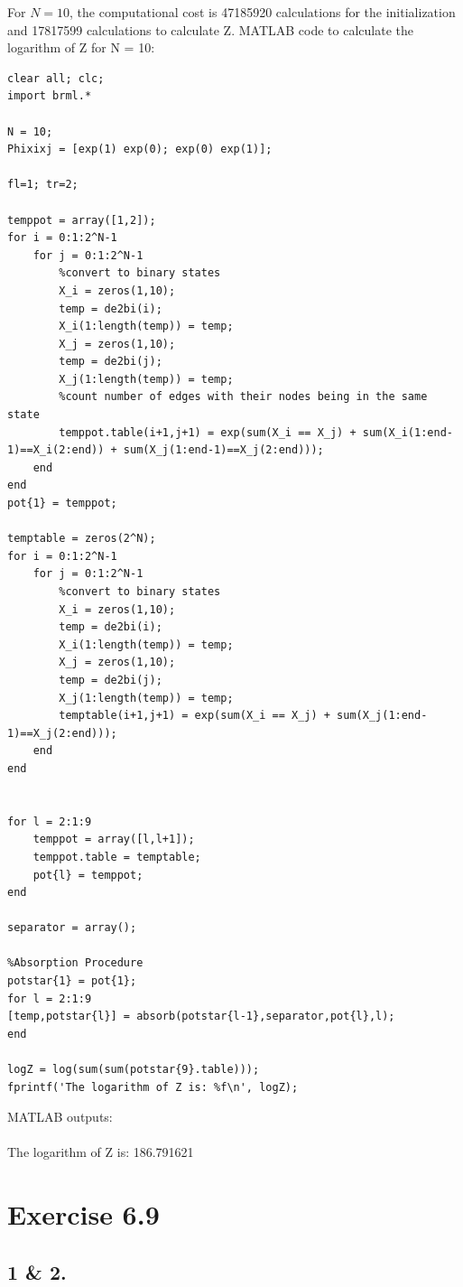 \documentclass[11pt,a4paper,oneside]{report}
\begin{document}
For $N=10$, the computational cost is 47185920 calculations for the initialization and 17817599 calculations to calculate Z. MATLAB code to calculate the logarithm of Z for N = 10:\\

\begin{lstlisting}
clear all; clc;
import brml.*

N = 10;
Phixixj = [exp(1) exp(0); exp(0) exp(1)];

fl=1; tr=2;

temppot = array([1,2]);
for i = 0:1:2^N-1
    for j = 0:1:2^N-1
        %convert to binary states
        X_i = zeros(1,10);
        temp = de2bi(i);
        X_i(1:length(temp)) = temp;
        X_j = zeros(1,10);
        temp = de2bi(j);
        X_j(1:length(temp)) = temp;
        %count number of edges with their nodes being in the same state
        temppot.table(i+1,j+1) = exp(sum(X_i == X_j) + sum(X_i(1:end-1)==X_i(2:end)) + sum(X_j(1:end-1)==X_j(2:end)));
    end
end
pot{1} = temppot;

temptable = zeros(2^N);
for i = 0:1:2^N-1
    for j = 0:1:2^N-1
        %convert to binary states
        X_i = zeros(1,10);
        temp = de2bi(i);
        X_i(1:length(temp)) = temp;
        X_j = zeros(1,10);
        temp = de2bi(j);
        X_j(1:length(temp)) = temp;
        temptable(i+1,j+1) = exp(sum(X_i == X_j) + sum(X_j(1:end-1)==X_j(2:end)));
    end
end


for l = 2:1:9
    temppot = array([l,l+1]);
    temppot.table = temptable;
    pot{l} = temppot;
end

separator = array();

%Absorption Procedure
potstar{1} = pot{1};
for l = 2:1:9
[temp,potstar{l}] = absorb(potstar{l-1},separator,pot{l},l);
end

logZ = log(sum(sum(potstar{9}.table)));
fprintf('The logarithm of Z is: %f\n', logZ);
\end{lstlisting}

MATLAB outputs:\\\\

The logarithm of Z is: 186.791621

\section*{Exercise 6.9}
\subsection*{1 \& 2.}
\end{document}
